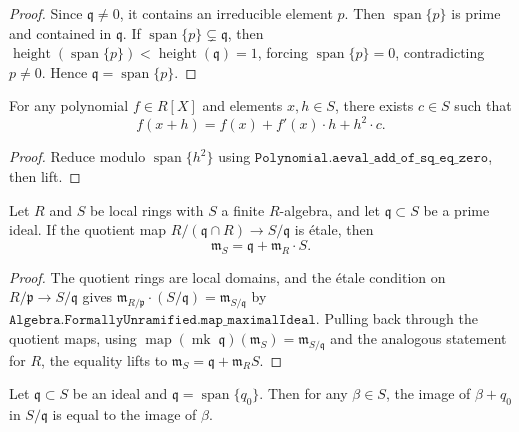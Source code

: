\begin{proof}
  \leanok
  Since $\mathfrak{q} \ne 0$, it contains an irreducible element $p$.
  Then $\operatorname{span}\{p\}$ is prime and contained in $\mathfrak{q}$.
  If $\operatorname{span}\{p\} \subsetneq \mathfrak{q}$, then
  $\operatorname{height}(\operatorname{span}\{p\}) < \operatorname{height}(\mathfrak{q}) = 1$,
  forcing $\operatorname{span}\{p\} = 0$, contradicting $p \ne 0$.
  Hence $\mathfrak{q} = \operatorname{span}\{p\}$.
\end{proof}

\begin{lemma}
  \label{lem:taylor_expansion}
  \leanok
  For any polynomial $f \in R[X]$ and elements $x, h \in S$, there exists $c \in S$
  such that
  \[
    f(x + h) = f(x) + f'(x) \cdot h + h^2 \cdot c.
  \]
\end{lemma}

\begin{proof}
  \leanok
  Reduce modulo $\operatorname{span}\{h^2\}$ using
  $\mathtt{Polynomial.aeval\_add\_of\_sq\_eq\_zero}$, then lift.
\end{proof}

\begin{lemma}
  \label{lem:maximalIdeal_eq_sup}
  \leanok
  Let $R$ and $S$ be local rings with $S$ a finite $R$-algebra, and let
  $\mathfrak{q} \subset S$ be a prime ideal.  If the quotient map
  $R/(\mathfrak{q} \cap R) \to S/\mathfrak{q}$ is étale, then
  \[
    \mathfrak{m}_S = \mathfrak{q} + \mathfrak{m}_R \cdot S.
  \]
\end{lemma}

\begin{proof}
  \leanok
  The quotient rings are local domains, and the étale condition on
  $R/\mathfrak{p} \to S/\mathfrak{q}$ gives
  $\mathfrak{m}_{R/\mathfrak{p}} \cdot (S/\mathfrak{q}) = \mathfrak{m}_{S/\mathfrak{q}}$
  by $\mathtt{Algebra.FormallyUnramified.map\_maximalIdeal}$.
  Pulling back through the quotient maps, using
  $\operatorname{map}(\operatorname{mk}\; \mathfrak{q})(\mathfrak{m}_S) = \mathfrak{m}_{S/\mathfrak{q}}$
  and the analogous statement for $R$, the equality lifts to
  $\mathfrak{m}_S = \mathfrak{q} + \mathfrak{m}_R S$.
\end{proof}

\begin{lemma}
  \label{lem:quotient_adjust}
  \leanok
  Let $\mathfrak{q} \subset S$ be an ideal and $\mathfrak{q} = \operatorname{span}\{q_0\}$.
  Then for any $\beta \in S$, the image of $\beta + q_0$ in $S/\mathfrak{q}$ is
  equal to the image of $\beta$.
\end{lemma}

